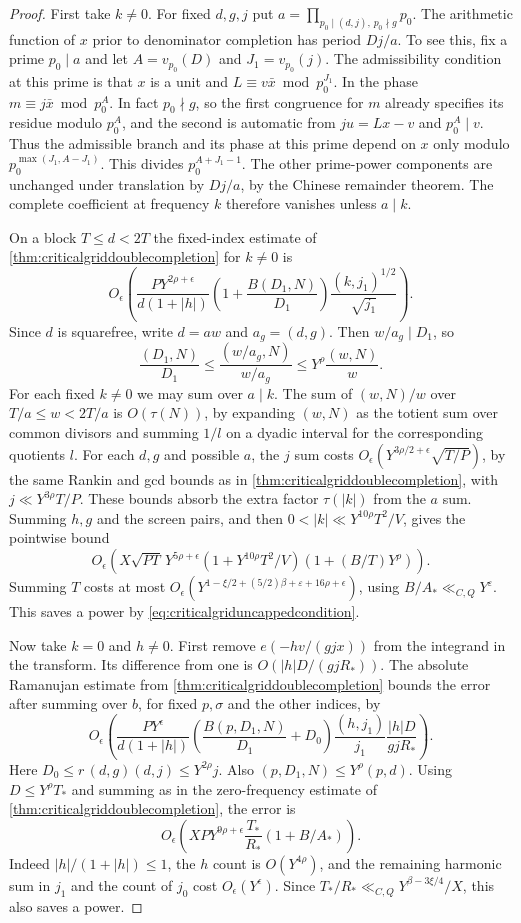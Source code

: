 \documentclass[11pt,a4paper]{article}
\numberwithin{equation}{section}
\begin{document}
\begin{proof}
First take $k\ne0$. For fixed $d,g,j$ put
$a=\prod_{p_0\mid(d,j),\,p_0\nmid g}p_0$.
The arithmetic function of $x$ prior to denominator
completion has period $Dj/a$. To see this, fix a prime
$p_0\mid a$ and let $A=v_{p_0}(D)$ and $J_1=v_{p_0}(j)$.
The admissibility condition at this prime is that $x$ is
a unit and $L\equiv v\bar x\bmod p_0^{J_1}$. In the phase
$m\equiv j\bar x\bmod p_0^A$. In fact $p_0\nmid g$, so
the first congruence for $m$ already specifies its residue
modulo $p_0^A$, and the second is automatic from
$ju=Lx-v$ and $p_0^A\mid v$. Thus the admissible branch
and its phase at this prime depend on $x$ only modulo
$p_0^{\max(J_1,A-J_1)}$. This divides $p_0^{A+J_1-1}$.
The other prime-power components are unchanged under
translation by $Dj/a$, by the Chinese remainder theorem.
The complete coefficient at frequency $k$ therefore
vanishes unless $a\mid k$.

On a block $T\le d<2T$ the fixed-index estimate of
\cref{thm:criticalgriddoublecompletion} for $k\ne0$ is
\[
 O_\epsilon\!\left(
 \frac{P Y^{2\rho+\epsilon}}{d(1+|h|)}
 \left(1+\frac{B(D_1,N)}{D_1}\right)
 \frac{(k,j_1)^{1/2}}{\sqrt{j_1}}\right).
\]
Since $d$ is squarefree, write $d=a w$ and $a_g=(d,g)$.
Then $w/a_g\mid D_1$, so
\[
 \frac{(D_1,N)}{D_1}\le
       \frac{(w/a_g,N)}{w/a_g}
       \le Y^\rho\frac{(w,N)}{w}.
\]
For each fixed $k\ne0$ we may sum over $a\mid k$.
The sum of $(w,N)/w$ over $T/a\le w<2T/a$ is
$O(\tau(N))$, by expanding $(w,N)$ as the totient
sum over common divisors and summing $1/l$ on a dyadic
interval for the corresponding quotients $l$.
For each $d,g$ and possible $a$, the $j$ sum costs
$O_\epsilon(Y^{3\rho/2+\epsilon}\sqrt{T/P})$, by the
same Rankin and gcd bounds as in
\cref{thm:criticalgriddoublecompletion}, with
$j\ll Y^{3\rho}T/P$. These bounds absorb the extra
factor $\tau(|k|)$ from the $a$ sum.
Summing $h,g$ and the screen pairs, and then
$0<|k|\ll Y^{10\rho}T^2/V$, gives the pointwise bound
\[
 O_\epsilon\!\left(
 X\sqrt{PT}\,Y^{5\rho+\epsilon}
   (1+Y^{10\rho}T^2/V)(1+(B/T)Y^\rho)\right).
\]
Summing $T$ costs at most
$O_\epsilon(Y^{1-\xi/2+(5/2)\beta+\varepsilon+16\rho+\epsilon})$,
using $B/A_*\ll_{C,Q}Y^\varepsilon$. This saves a power
by \cref{eq:criticalgriduncappedcondition}.

Now take $k=0$ and $h\ne0$. First remove
$e(-hv/(g j x))$ from the integrand in the transform.
Its difference from one is $O(|h|D/(g j R_*))$.
The absolute Ramanujan estimate from
\cref{thm:criticalgriddoublecompletion} bounds the
error after summing over $b$, for fixed $p,\sigma$
and the other indices, by
\[
 O_\epsilon\!\left(
 \frac{P Y^\epsilon}{d(1+|h|)}
 \left(\frac{B(p,D_1,N)}{D_1}+D_0\right)
 \frac{(h,j_1)}{j_1}\frac{|h|D}{g j R_*}\right).
\]
Here $D_0\le r\,(d,g)(d,j)\le Y^{2\rho}j$.
Also $(p,D_1,N)\le Y^\rho(p,d)$.
Using $D\le Y^\rho T_*$ and summing as in the
zero-frequency estimate of \cref{thm:criticalgriddoublecompletion},
the error is
\[
 O_\epsilon\!\left(
 XP Y^{9\rho+\epsilon}\frac{T_*}{R_*}(1+B/A_*)\right).
\]
Indeed $|h|/(1+|h|)\le1$, the $h$ count is
$O(Y^{4\rho})$, and the remaining harmonic sum in
$j_1$ and the count of $j_0$ cost $O_\epsilon(Y^\epsilon)$.
Since $T_*/R_*\ll_{C,Q}Y^{\beta-3\xi/4}/X$,
this also saves a power.


\end{proof}
\end{document}
